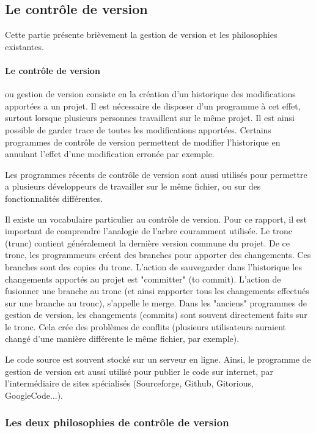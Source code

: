 \subsection{Le contrôle de version}

Cette partie présente brièvement la gestion de version et les philosophies existantes.

\paragraph{Le contrôle de version} ou gestion de version consiste en
la création d'un historique des modifications apportées a un projet.
Il est nécessaire de disposer d'un programme à cet effet,
surtout lorsque plusieurs personnes travaillent sur le même projet.
Il est ainsi possible de garder trace de toutes les modifications apportées.
Certains programmes de contrôle de version permettent
de modifier l'historique en annulant l'effet d'une modification erronée par exemple.

Les programmes récents de contrôle de version sont aussi utilisés
pour permettre a plusieurs développeurs de travailler 
sur le même fichier, ou sur des fonctionnalités différentes.

Il existe un vocabulaire particulier au contrôle de version.
Pour ce rapport, il est important de comprendre l'analogie de l'arbre couramment utilisée.
Le tronc (trunc) contient généralement la dernière version commune du projet.
De ce tronc, les programmeurs créent des branches pour apporter des changements.
Ces branches sont des copies du tronc.
L'action de sauvegarder dans l'historique les changements apportés au projet est "committer" (to commit).
L'action de fusionner une branche au tronc
(et ainsi rapporter tous les changements effectués sur une branche au tronc), s'appelle le merge.
Dans les  "anciens" programmes de gestion de version,
les changements (commits) sont souvent directement faits sur le tronc.
Cela crée des problèmes de conflits
(plusieurs utilisateurs auraient changé d'une manière différente le même fichier, par exemple).

Le code source est souvent stocké sur un serveur en ligne.
Ainsi, le programme de gestion de version est aussi utilisé
pour publier le code sur internet, par l'intermédiaire de sites spécialisés
(Sourceforge, Github, Gitorious, GoogleCode...).



\subsubsection{Les deux philosophies de contrôle de version} 

